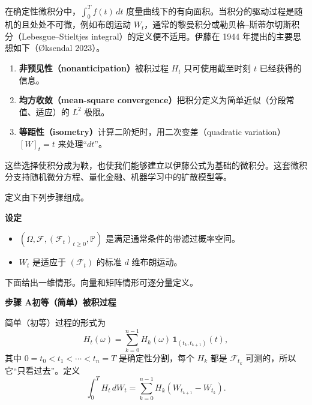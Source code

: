 

在确定性微积分中，$\int_0^T f(t)\,dt$ 度量曲线下的有向面积。当积分的驱动过程是随机的且处处不可微，例如布朗运动 $W_t$，通常的黎曼积分或勒贝格–斯蒂尔切斯积分（Lebesgue–Stieltjes integral）的定义便不适用。伊藤在 1944 年提出的主要思想如下（Øksendal 2023）。
\begin{enumerate}
  \item \textbf{非预见性（nonanticipation）}被积过程 $H_t$ 只可使用截至时刻 $t$ 已经获得的信息。
  \item \textbf{均方收敛（mean-square convergence）}把积分定义为简单近似（分段常值、适应）的 $L^2$ 极限。
  \item \textbf{等距性（isometry）}计算二阶矩时，用二次变差（quadratic variation）$[W]_t=t$ 来处理“$dt$”。
\end{enumerate}
这些选择使积分成为鞅，也使我们能够建立以伊藤公式为基础的微积分。这套微积分支持随机微分方程、量化金融、机器学习中的扩散模型等。


定义由下列步骤组成。

\textbf{设定}
\begin{itemize}
  \item $(\Omega,\mathcal F,(\mathcal F_t)_{t\geq0},\mathbb P)$ 是满足通常条件的带滤过概率空间。
  \item $W_t$ 是适应于 $(\mathcal F_t)$ 的标准 $d$ 维布朗运动。
\end{itemize}
下面给出一维情形。向量和矩阵情形可逐分量定义。

\textbf{步骤 A\quad 初等（简单）被积过程}\par
简单（初等）过程的形式为
\[
  H_t(\omega)=\sum_{k=0}^{n-1}H_k(\omega)\,\mathbf1_{(t_k,t_{k+1})}(t),
\]
其中 $0=t_0<t_1<\cdots<t_n=T$ 是确定性分割，每个 $H_k$ 都是 $\mathcal F_{t_k}$ 可测的，所以它“只看过去”。定义
\begin{equation*}
  \int_0^T H_t\,dW_t=\sum_{k=0}^{n-1}H_k(W_{t_{k+1}}-W_{t_k}).
  \tag{6K1}\label{eq:6K1}
\end{equation*}

